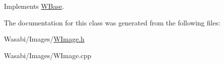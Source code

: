 Implements \hyperlink{class_w_base_a76ac973ba9a43e182f6a6a4869d69725}{W\+Base}.



The documentation for this class was generated from the following files\+:\begin{DoxyCompactItemize}
\item 
Wasabi/\+Images/\hyperlink{_w_image_8h}{W\+Image.\+h}\item 
Wasabi/\+Images/W\+Image.\+cpp\end{DoxyCompactItemize}
